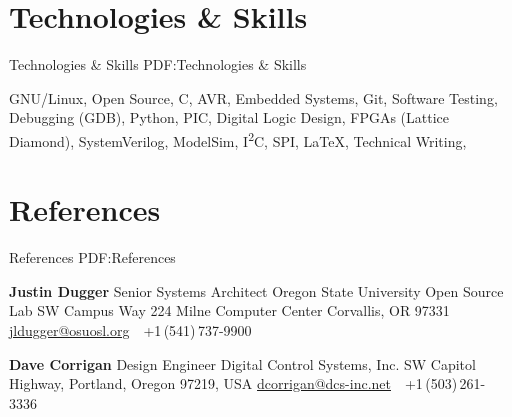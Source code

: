 \documentclass[letterpaper,MMMyyyy,nonstop]{simpleresumecv}
\begin{document}
\begin{body}
\iffalse

\section
{Other Work\newline
Experience}
{Other Work Experience}
{PDF:OtherWorkExperience}

\textbf{Wilsonville High School},
Wilsonville, Oregon, USA

\GapNoBreak
\BulletItem
Teacher's Aide,
Computer Science \& Conceptual Physics
\hfill
\DatestampYMD{2015}{01}{15} --
\DatestampYMD{2015}{06}{06}
\begin{detail}
\SubBulletItem
Assisted students with problem solving methods in AP Computer Science A and Conceptual Physics courses; demonstrated physical concepts through examples and assisted with carrying out lab activities.
\end{detail}

\fi


\section
{Technologies \& Skills}
{Technologies \& Skills}
{PDF:Technologies \& Skills }

GNU/Linux,
Open Source,
C,
AVR,
Embedded Systems,
Git,
Software Testing,
Debugging (GDB),
Python,
PIC,
Digital Logic Design,
FPGAs (Lattice Diamond),
SystemVerilog,
ModelSim,
I\textsuperscript{2}C,
SPI,
{\LaTeX},
Technical Writing,

\iffalse
\section
{References}
{References}
{PDF:References}

\Gap
\BulletItem
\textbf{Justin Dugger}
\newline
Senior Systems Architect
\newline
Oregon State University Open Source Lab
 SW Campus Way
224 Milne Computer Center
Corvallis, OR 97331
\newline
\href{mailto:jldugger@osuosl.org}
{jldugger@osuosl.org}
\,\SubBulletSymbol\,
+1\,(541)\,737-9900

\BigGap
\BulletItem
\textbf{Dave Corrigan}
\newline
Design Engineer
\newline
Digital Control Systems, Inc.
 SW Capitol Highway, 
Portland, Oregon 97219, USA
\newline
\href{mailto:dcorrigan@dcs-inc.net}
{dcorrigan@dcs-inc.net}
\,\SubBulletSymbol\,
+1\,(503)\,261-3336


\end{body}
\end{document}
